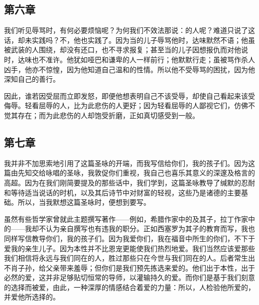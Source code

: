 
\subsection{第六章}

\par

我们听见辱骂时，有何必要烦恼呢？为何我们不效法那说：的人呢？难道只说了这话，却未实践吗？不，他也实践了。因为当的儿子辱骂他时，达味默然不语；他虽被武装的人围绕，却没有还口，也不寻求报复；甚至当的儿子因想报仇而对他说时，达味也不准许。他犹如哑巴和谦卑的人一样前行；他默默行走；虽被骂作杀人凶手，他亦不惊惶，因为他知道自己温和的性情。所以他不受辱骂的困扰，因为他深知自己的善行。\par

因此，谁若因受屈而立即发怒，即便他想表明自己不该受辱，却使自己看起来该受侮辱。轻看屈辱的人，比为此悲伤的人更好；因为轻看屈辱的人鄙视它们，仿佛不觉其存在；而为此悲伤的人却饱受折磨，正如真切感受到一般。\par


\subsection{第七章}

\par

我并非不加思索地引用了这篇圣咏的开端，而我写信给你们，我的孩子们。因为这篇由先知交给咏唱的圣咏，我敦促你们重视，我自己也喜乐其意义的深邃及格言的高超。因为在我们刚简要提及的那些话中，我们学到，这篇圣咏教导了缄默的忍耐和等待适当说话的时机，以及其后诗节中对财富的轻视，这些乃是诸德的主要基础。所以，当我默想这篇圣咏时，便想到要写。\par

虽然有些哲学家曾就此主题撰写著作——例如，希腊作家中的及其子，拉丁作家中的——我却不认为亲自撰写也有违我的职分。正如西塞罗为其子的教育而写，我也同样写信教导你们，我的孩子们。因为我爱你们，我在福音中所生的你们，不下于爱我的亲生儿子。因为本性并不比恩宠更能使我们热烈地爱。我们当然应该爱那些我们相信将永远与我们同在的人，胜过那些只在今世与我们同在的人。后者常生出不肖子孙，给父亲带来羞辱；但你们是我们预先拣选来爱的。他们出于本性，出于必然的爱，这并非足够贴切恒常的导师，以灌输持久的爱。而你们是基于我们刻意的选择而被爱，由此，一种深厚的情感结合着爱的力量：所以，人检验他所爱的，并爱他所选择的。\par

